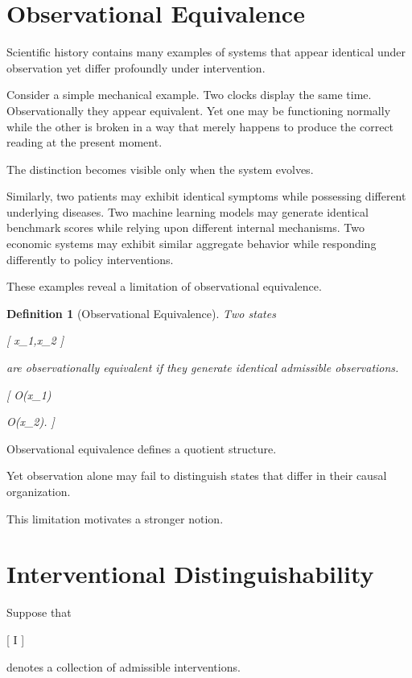 \documentclass[11pt,oneside,openany]{book}
\newtheorem{definition}{Definition}[chapter] \newtheorem{theorem}{Theorem}[chapter] \newtheorem{proposition}{Proposition}[chapter] \newtheorem{lemma}{Lemma}[chapter] \newtheorem{corollary}{Corollary}[chapter] \newtheorem{remark}{Remark}[chapter]
\begin{document}
\section{Observational Equivalence}

Scientific history contains many examples of systems that appear identical under observation yet differ profoundly under intervention.

Consider a simple mechanical example. Two clocks display the same time. Observationally they appear equivalent. Yet one may be functioning normally while the other is broken in a way that merely happens to produce the correct reading at the present moment.

The distinction becomes visible only when the system evolves.

Similarly, two patients may exhibit identical symptoms while possessing different underlying diseases. Two machine learning models may generate identical benchmark scores while relying upon different internal mechanisms. Two economic systems may exhibit similar aggregate behavior while responding differently to policy interventions.

These examples reveal a limitation of observational equivalence.

\begin{definition}[Observational Equivalence]

Two states

[
x_1,x_2
]

are observationally equivalent if they generate identical admissible observations.

[
O(x_1)

O(x_2).
]

\end{definition}

Observational equivalence defines a quotient structure.

Yet observation alone may fail to distinguish states that differ in their causal organization.

This limitation motivates a stronger notion.

\section{Interventional Distinguishability}

Suppose that

[
\mathcal I
]

denotes a collection of admissible interventions.
\end{document}
